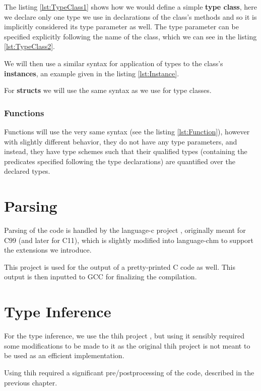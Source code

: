 The listing \ref{lst:TypeClass1} shows how we would define a simple \textbf{type class}, here we declare only one type we use in declarations of the class's methods and so it is implicitly considered its type parameter as well. The type parameter can be specified explicitly following the name of the class, which we can see in the listing \ref{lst:TypeClass2}.

We will then use a similar syntax for application of types to the class's \textbf{instances}, an example given in the listing \ref{lst:Instance}.

For \textbf{structs} we will use the same syntax as we use for type classes.

\subsubsection{Functions}

Functions will use the very same syntax (see the listing \ref{lst:Function}), however with slightly different behavior, they do not have any type parameters, and instead, they have type schemes such that their qualified types (containing the predicates specified following the type declarations) are quantified over the declared types.

\section{Parsing}

Parsing of the code is handled by the language-c project \cite{visq2018language-c}, originally meant for C99 (and later for C11), which is slightly modified into language-chm to support the extensions we introduce.

This project is used for the output of a pretty-printed C code as well. This output is then inputted to GCC for finalizing the compilation.

\section{Type Inference}

For the type inference, we use the thih project \cite{jones1999typing}, but using it sensibly required some modifications to be made to it as the original thih project is not meant to be used as an efficient implementation.

Using thih required a significant pre/postprocessing of the code, described in the previous chapter.

